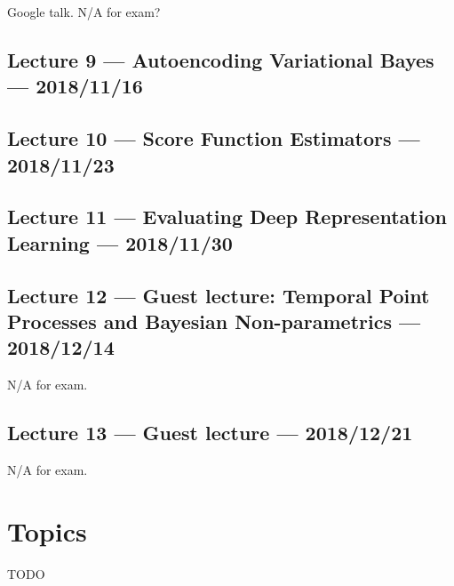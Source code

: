 \documentclass{article}
\begin{document}
Google talk. N/A for exam?

\subsection{Lecture 9 --- Autoencoding Variational Bayes --- 2018/11/16}

\subsection{Lecture 10 --- Score Function Estimators --- 2018/11/23}

\subsection{Lecture 11 --- Evaluating Deep Representation Learning --- 2018/11/30}

\subsection{Lecture 12 --- Guest lecture: Temporal Point Processes and Bayesian Non-parametrics --- 2018/12/14}

N/A for exam.

\subsection{Lecture 13 --- Guest lecture --- 2018/12/21}

N/A for exam.

\section{Topics}

TODO



\end{document}
